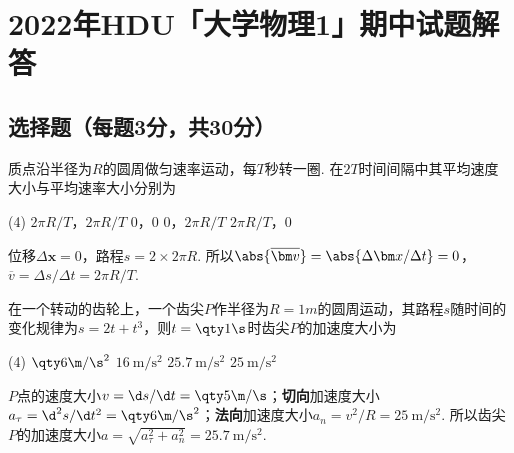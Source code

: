 \chapter*{2022年\textsf{HDU}「大学物理1」期中试题解答}



\section{选择题（每题3分，共30分）}

\begin{problem} %
质点沿半径为$R$的圆周做匀速率运动，每$T$秒转一圈. 在$2T$时间间隔中其平均速度大小与平均速率大小分别为
\begin{tasks}(4)
    \task $2\pi R/T$，$2\pi R/T$
    \task $0$，$0$
    \task[\true] $0$，$2\pi R/T$
    \task $2\pi R/T$，$0$
\end{tasks}
\end{problem}
\begin{solution}
    位移$\Delta \bm x=0$，路程$s=2\times 2\pi R$. 所以$\abs{\overline{\bm v}}=\abs{\Delta\bm x/\Delta t}=0$，$\overline{v}=\Delta s/\Delta t=2\pi R/T$.
\end{solution}

\begin{problem} %
在一个转动的齿轮上，一个齿尖$P$作半径为$R=1m$的圆周运动，其路程$s$随时间的变化规律为$s=2t+t^3$，则$t=\qty1\s$时齿尖$P$的加速度大小为
\begin{tasks}(4)
    \task $\qty6{\m/\s^2}$
    \task $\qty{16}{\m/\s^2}$
    \task[\true] $\qty{25.7}{\m/\s^2}$
    \task $\qty{25}{\m/\s^2}$
\end{tasks}
\end{problem}
\begin{solution}
    $P$点的速度大小$v=\d s/\d t=\qty5{\m/\s}$；\textbf{切向}加速度大小$a_{\tau}=\d^2 s/\d t^2=\qty6{\m/\s^2}$；\textbf{法向}加速度大小$a_n=v^2/R=\qty{25}{\m/\s^2}$. 所以齿尖$P$的加速度大小$a=\sqrt{a_{\tau}^2+a_n^2}=\qty{25.7}{\m/\s^2}$.
\end{solution}

